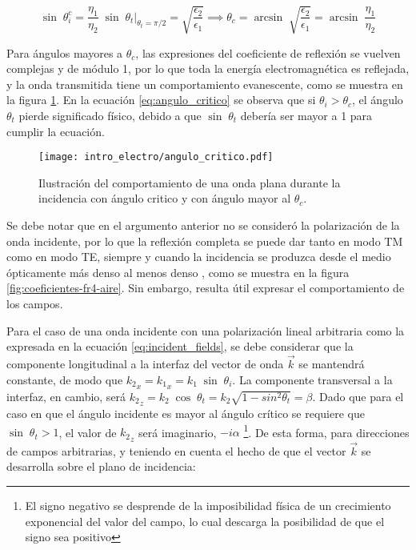 \begin{equation}
	\label{eq:angulo_critico}
	\sin\; \theta_i^c = \frac{\eta_1}{\eta_2}\;\sin \; \theta_t|_{\theta_t=\pi/2} = \sqrt{\frac{\epsilon_2}{\epsilon_1}} \implies \theta_c = \arcsin \;\sqrt{\frac{\epsilon_2}{\epsilon_1}} = \arcsin \;\frac{\eta_1}{\eta_2}
\end{equation}

Para ángulos mayores a $\theta_c$, las expresiones del coeficiente de reflexión se vuelven complejas y de módulo 1, por lo que toda la energía electromagnética es reflejada, y la onda transmitida tiene un comportamiento evanescente, como se muestra en la figura \ref{fig:angulo_critico}. En la ecuación \ref{eq:angulo_critico} se observa que si $\theta_i > \theta_c$, el ángulo $\theta_t$ pierde significado físico, debido a que $\sin\; \theta_t$ debería ser mayor a 1 para cumplir la ecuación.

\begin{figure}[htp]
	\centering
	\texttt{[image: intro\_electro/angulo\_critico.pdf]}
	\caption{Ilustración del comportamiento de una onda plana durante la incidencia con ángulo critico y con ángulo mayor al $\theta_c$.}
	\label{fig:angulo_critico}
\end{figure}

Se debe notar que en el argumento anterior no se consideró la polarización de la onda incidente, por lo que la reflexión completa se puede dar tanto en modo TM como en modo TE, siempre y cuando la incidencia se produzca desde el medio ópticamente más denso al menos denso \cite{Fernandez:Electromag}, como se muestra en la figura \ref{fig:coeficientes-fr4-aire}. Sin embargo, resulta útil expresar el comportamiento de los campos.

Para el caso de una onda incidente con una polarización lineal arbitraria como la expresada en la ecuación \ref{eq:incident_fields}, se debe considerar que la componente longitudinal a la interfaz del vector de onda $\vec{k}$ se mantendrá constante, de modo que ${k_2}_x = {k_1}_x = k_1 \; \sin \; \theta_i$. La componente transversal a la interfaz, en cambio, será ${k_2}_z = k_2\; \cos \; \theta_t = k_2 \sqrt{1-sin^2\theta_t} = \beta$. Dado que para el caso en que el ángulo incidente es mayor al ángulo crítico se requiere que $\sin\;\theta_t > 1$, el valor de ${k_2}_z$ será imaginario, $-i\alpha$ \footnote{El signo negativo se desprende de la imposibilidad física de un crecimiento exponencial del valor del campo, lo cual descarga la posibilidad de que el signo sea positivo}. De esta forma, para direcciones de campos arbitrarias, y teniendo en cuenta el hecho de que el vector $\vec{k}$ se desarrolla sobre el plano de incidencia:

